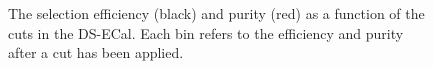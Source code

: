 \begin{figure}
\begin{minipage}{.5\linewidth}
\centering
{}
\end{minipage}\par\medskip
\caption{The selection efficiency (black) and purity (red) as a function of the cuts in the DS-ECal.  Each bin refers to the efficiency and purity after a cut has been applied.}
\label{fig:SelEffPurCutLevelDS}
\end{figure}
